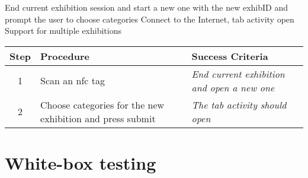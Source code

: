 \testcase
{\casenine}
{End current exhibition session and start a new one with the new exhibID and prompt the user to choose categories}
{Connect to the Internet, tab activity open}
{Support for multiple exhibitions}
\begin{center}
\begin{tabular}{| c | p{4.6cm} | p{4.6cm} |}
\hline
\textbf{Step} & \textbf{Procedure} & \textbf{Success Criteria}\\
\hline
1 & Scan an \ac{nfc} tag & \textit{End current exhibition and open a new one}\\
\hline
2 & Choose categories for the new exhibition and press submit & \textit{The tab activity should open}\\
\hline
\end{tabular}
\end{center}

\section{White-box testing}

